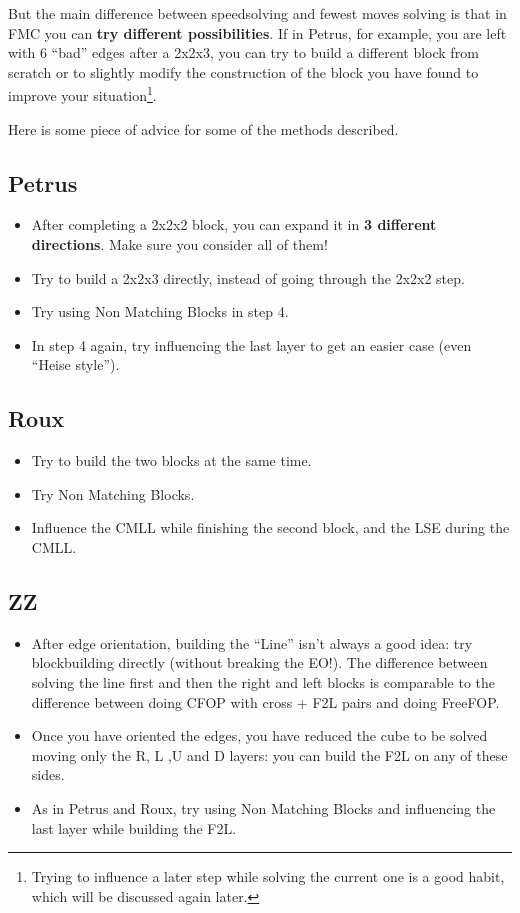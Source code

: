 \documentclass[11pt,a4paper]{book}
\begin{document}
But the main difference between speedsolving and fewest moves solving is that in FMC you can \textbf{try different possibilities}. If in Petrus, for example, you are left with 6 ``bad'' edges after a 2x2x3, you can try to build a different block from scratch or to slightly modify the construction of the block you have found to improve your situation\footnote{Trying to influence a later step while solving the current one is a good habit, which will be discussed again later.}.

Here is some piece of advice for some of the methods described.

\subsection{Petrus}
\begin{itemize}
\item After completing a 2x2x2 block, you can expand it in \textbf{3 different directions}. Make sure you consider all of them!
\item Try to build a 2x2x3 directly, instead of going through the 2x2x2 step.
\item Try using Non Matching Blocks in step 4.
\item In step 4 again, try influencing the last layer to get an easier case (even ``Heise style'').
\end{itemize}

\subsection{Roux}
\begin{itemize}
\item Try to build the two blocks at the same time.
\item Try Non Matching Blocks.
\item Influence the CMLL while finishing the second block, and the LSE during the CMLL.
\end{itemize}

\subsection{ZZ}
\begin{itemize}
\item After edge orientation, building the ``Line'' isn't always a good idea: try blockbuilding directly (without breaking the EO!). The difference between solving the line first and then the right and left blocks is comparable to the difference between doing CFOP with cross + F2L pairs and doing FreeFOP.
\item Once you have oriented the edges, you have reduced the cube to be solved moving only the R, L ,U and D layers: you can build the F2L on any of these sides.
\item As in Petrus and Roux, try using Non Matching Blocks and influencing the last layer while building the F2L.
\end{itemize}
\end{document}
